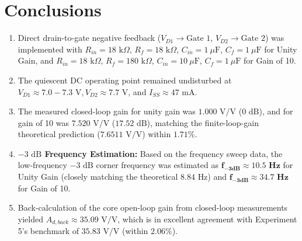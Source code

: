 \documentclass[11pt,a4paper]{article}
\begin{document}
\section{Conclusions}
\begin{enumerate}
    \item Direct drain-to-gate negative feedback ($V_{D1} \to \text{Gate } 1$, $V_{D2} \to \text{Gate } 2$) was implemented with $R_{in} = 18\text{ k}\Omega$, $R_f = 18\text{ k}\Omega$, $C_{in} = 1\ \mu\text{F}$, $C_f = 1\ \mu\text{F}$ for Unity Gain, and $R_{in} = 18\text{ k}\Omega$, $R_f = 180\text{ k}\Omega$, $C_{in} = 10\ \mu\text{F}$, $C_f = 1\ \mu\text{F}$ for Gain of 10.
    \item The quiescent DC operating point remained undisturbed at $V_{D1} \approx 7.0 - 7.3\text{ V}, V_{D2} \approx 7.7\text{ V}$, and $I_{SS} \approx 47\text{ mA}$.
    \item The measured closed-loop gain for unity gain was $1.000\text{ V/V}$ ($0\text{ dB}$), and for gain of 10 was $7.520\text{ V/V}$ ($17.52\text{ dB}$), matching the finite-loop-gain theoretical prediction ($7.6511\text{ V/V}$) within $\mathbf{1.71\%}$.
    \item \textbf{$-3\text{ dB}$ Frequency Estimation:} Based on the frequency sweep data, the low-frequency $-3\text{ dB}$ corner frequency was estimated as $\mathbf{f_{-3\text{dB}} \approx 10.5\text{ Hz}}$ for Unity Gain (closely matching the theoretical $8.84\text{ Hz}$) and $\mathbf{f_{-3\text{dB}} \approx 34.7\text{ Hz}}$ for Gain of 10.
    \item Back-calculation of the core open-loop gain from closed-loop measurements yielded $A_{d,back} \approx 35.09\text{ V/V}$, which is in excellent agreement with Experiment 5's benchmark of $35.83\text{ V/V}$ (within $2.06\%$).
\end{enumerate}
\end{document}
